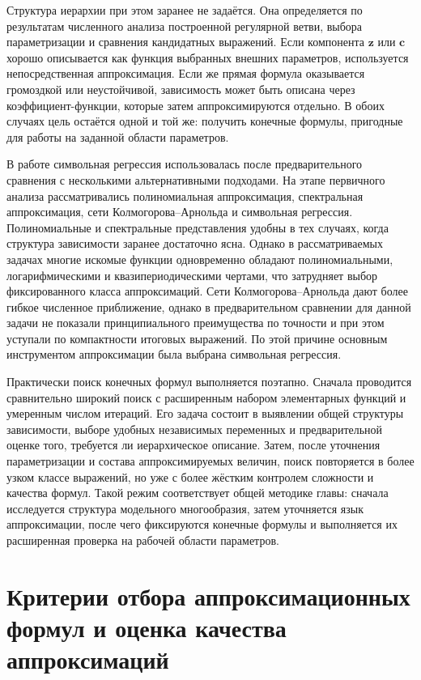 Структура иерархии при этом заранее не задаётся. Она определяется по результатам численного анализа построенной регулярной ветви, выбора параметризации и сравнения кандидатных выражений. Если компонента \(\mathbf z\) или \(\mathbf c\) хорошо описывается как функция выбранных внешних параметров, используется непосредственная аппроксимация. Если же прямая формула оказывается громоздкой или неустойчивой, зависимость может быть описана через коэффициент-функции, которые затем аппроксимируются отдельно. В обоих случаях цель остаётся одной и той же: получить конечные формулы, пригодные для работы на заданной области параметров.

В работе символьная регрессия использовалась после предварительного сравнения с несколькими альтернативными подходами. На этапе первичного анализа рассматривались полиномиальная аппроксимация, спектральная аппроксимация, сети Колмогорова--Арнольда \cite{liu_kan_2024} и символьная регрессия. Полиномиальные и спектральные представления удобны в тех случаях, когда структура зависимости заранее достаточно ясна. Однако в рассматриваемых задачах многие искомые функции одновременно обладают полиномиальными, логарифмическими и квазипериодическими чертами, что затрудняет выбор фиксированного класса аппроксимаций. Сети Колмогорова--Арнольда дают более гибкое численное приближение, однако в предварительном сравнении для данной задачи не показали принципиального преимущества по точности и при этом уступали по компактности итоговых выражений. По этой причине основным инструментом аппроксимации была выбрана символьная регрессия.

Практически поиск конечных формул выполняется поэтапно. Сначала проводится сравнительно широкий поиск с расширенным набором элементарных функций и умеренным числом итераций. Его задача состоит в выявлении общей структуры зависимости, выборе удобных независимых переменных и предварительной оценке того, требуется ли иерархическое описание. Затем, после уточнения параметризации и состава аппроксимируемых величин, поиск повторяется в более узком классе выражений, но уже с более жёстким контролем сложности и качества формул. Такой режим соответствует общей методике главы: сначала исследуется структура модельного многообразия, затем уточняется язык аппроксимации, после чего фиксируются конечные формулы и выполняется их расширенная проверка на рабочей области параметров.

\section{Критерии отбора аппроксимационных формул и оценка качества аппроксимаций}

